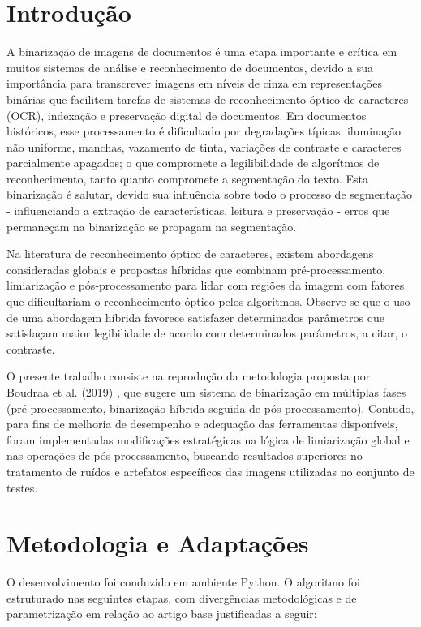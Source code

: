 \documentclass[conference]{IEEEtran}
\begin{document}
\section{Introdução}
A binarização de imagens de documentos é uma etapa importante e crítica em muitos sistemas de análise e reconhecimento de documentos, devido a  sua importância para transcrever imagens em níveis de cinza em representações binárias que facilitem tarefas de sistemas de reconhecimento óptico de caracteres (OCR), indexação e preservação digital de documentos. Em documentos históricos, esse processamento é dificultado por degradações típicas: iluminação não uniforme, manchas, vazamento de tinta, variações de contraste e caracteres parcialmente apagados; o que compromete a legilibilidade de algorítmos de reconhecimento, tanto quanto compromete a segmentação do texto. Esta binarização é salutar, devido sua influência sobre todo o processo de segmentação - influenciando a extração de características, leitura e preservação - erros que permaneçam na binarização se propagam na segmentação.

Na literatura de reconhecimento óptico de caracteres, existem abordagens consideradas globais e propostas híbridas que combinam pré-processamento, limiarização e pós-processamento para lidar com regiões da imagem com fatores que dificultariam o reconhecimento óptico pelos algoritmos. Observe-se que o uso de uma abordagem híbrida favorece satisfazer determinados parâmetros que satisfaçam maior legibilidade de acordo com determinados parâmetros, a citar, o contraste.

O presente trabalho consiste na reprodução da metodologia proposta por Boudraa et al. (2019) \cite{boudraa2019}, que sugere um sistema de binarização em múltiplas fases (pré-processamento, binarização híbrida seguida de pós-processamento). Contudo, para fins de melhoria de desempenho e adequação das ferramentas disponíveis, foram implementadas modificações estratégicas na lógica de limiarização global e nas operações de pós-processamento, buscando resultados superiores no tratamento de ruídos e artefatos específicos das imagens utilizadas no conjunto de testes. 

\section{Metodologia e Adaptações}
O desenvolvimento foi conduzido em ambiente Python. O algoritmo foi estruturado nas seguintes etapas, com divergências metodológicas e de parametrização em relação ao artigo base justificadas a seguir:
\end{document}
